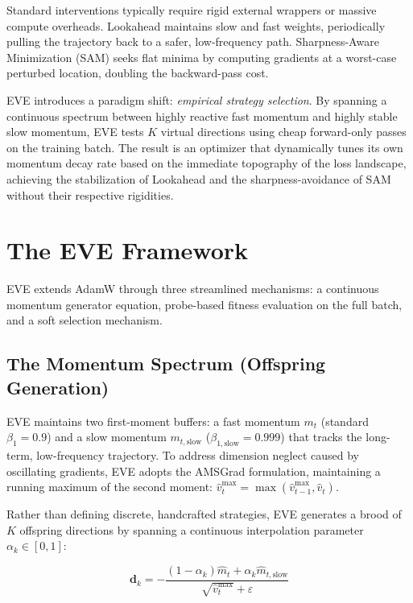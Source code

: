 \documentclass[12pt]{article}
\begin{document}
Standard interventions typically require rigid external wrappers or massive compute overheads. Lookahead maintains slow and fast weights, periodically pulling the trajectory back to a safer, low-frequency path. Sharpness-Aware Minimization (SAM) seeks flat minima by computing gradients at a worst-case perturbed location, doubling the backward-pass cost. 

EVE introduces a paradigm shift: \textit{empirical strategy selection}. By spanning a continuous spectrum between highly reactive fast momentum and highly stable slow momentum, EVE tests $K$ virtual directions using cheap forward-only passes on the training batch. The result is an optimizer that dynamically tunes its own momentum decay rate based on the immediate topography of the loss landscape, achieving the stabilization of Lookahead and the sharpness-avoidance of SAM without their respective rigidities.

\section{The EVE Framework}
\label{sec:method}

EVE extends AdamW through three streamlined mechanisms: a continuous momentum generator equation, probe-based fitness evaluation on the full batch, and a soft selection mechanism.

\subsection{The Momentum Spectrum (Offspring Generation)}
EVE maintains two first-moment buffers: a fast momentum $m_t$ (standard $\beta_1 = 0.9$) and a slow momentum $m_{t,\mathrm{slow}}$ ($\beta_{1,\mathrm{slow}} = 0.999$) that tracks the long-term, low-frequency trajectory. To address dimension neglect caused by oscillating gradients, EVE adopts the AMSGrad formulation, maintaining a running maximum of the second moment: $\hat{v}^{\max}_t = \max(\hat{v}^{\max}_{t-1}, \hat{v}_t)$.

Rather than defining discrete, handcrafted strategies, EVE generates a brood of $K$ offspring directions by spanning a continuous interpolation parameter $\alpha_k \in [0, 1]$:

\begin{equation}
  \mathbf{d}_k = - \frac{(1 - \alpha_k)\hat{m}_t + \alpha_k\hat{m}_{t,\mathrm{slow}}}{\sqrt{\hat{v}^{\max}_t} + \varepsilon}
  \label{eq:generator}
\end{equation}
\end{document}
